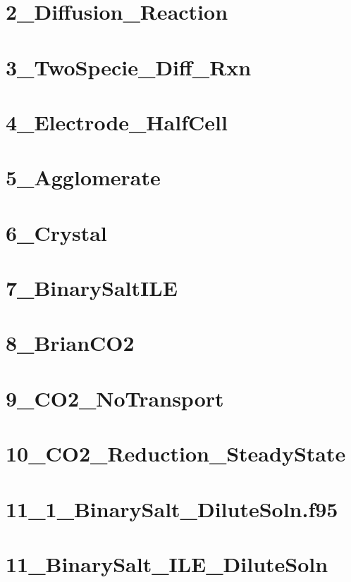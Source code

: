 \documentclass[12pt]{article}
\begin{document}
	\clearpage
	\section*{2\_Diffusion\_Reaction}

	\clearpage
	\section*{3\_TwoSpecie\_Diff\_Rxn}

	\clearpage
	\section*{4\_Electrode\_HalfCell}

	\clearpage
	\section*{5\_Agglomerate}

	\clearpage
	\section*{6\_Crystal}

	\clearpage
	\section*{7\_BinarySaltILE}

	\clearpage
	\section*{8\_BrianCO2}

	\clearpage
	\section*{9\_CO2\_NoTransport}

	\clearpage
	\section*{10\_CO2\_Reduction\_SteadyState}

	\clearpage
	\section*{11\_1\_BinarySalt\_DiluteSoln.f95}

	\clearpage
	\section*{11\_BinarySalt\_ILE\_DiluteSoln}
\end{document}
